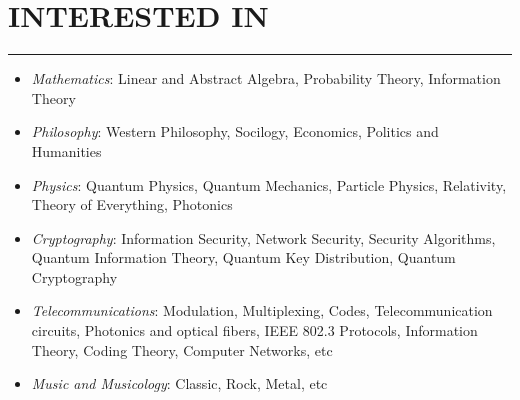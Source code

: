 \documentclass[10pt,a4paper]{article}
\begin{document}

\section{INTERESTED IN}
\noindent \rule {3.2cm}{0.4pt}
  \begin{itemize}
    \setlength{\rightskip}{2cm}
    \setlength\itemsep{0em}
    \item \small \textit{Mathematics}: Linear and Abstract Algebra, Probability Theory, Information Theory
	  \item \small \textit{Philosophy}: Western Philosophy, Socilogy, Economics, Politics and Humanities
	  \item \small \textit{Physics}: Quantum Physics, Quantum Mechanics, Particle Physics, Relativity, Theory of Everything, Photonics 
	  \item \small \textit{Cryptography}: Information Security, Network Security, Security Algorithms, Quantum Information Theory, Quantum Key Distribution, Quantum Cryptography 
	  \item \small \textit{Telecommunications}: Modulation, Multiplexing, Codes, Telecommunication circuits, Photonics and optical fibers, IEEE 802.3 Protocols, Information Theory, Coding Theory, Computer Networks, etc 
    \item \small \textit{Music and Musicology}: Classic, Rock, Metal, etc
  \end{itemize}
\end{document}
